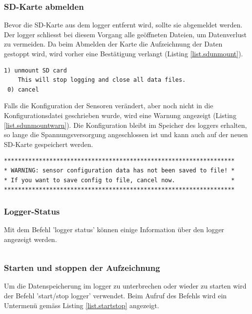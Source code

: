 \subsubsection{SD-Karte abmelden}\label{sssec.sdunmount}
Bevor die SD-Karte aus dem \gls{logger} entfernt wird, sollte sie abgemeldet werden. Der \gls{logger} schliesst bei diesem Vorgang alle geöffneten Dateien, um Datenverlust zu vermeiden. Da beim Abmelden der Karte die Aufzeichnung der Daten gestoppt wird, wird vorher eine Bestätigung verlangt (Listing \ref{list.sdunmount}).

\begin{lstlisting}[caption=Untermenü SD-Karte abmelden, label=list.sdunmount]
 1) unmount SD card
    This will stop logging and close all data files.
 0) cancel
\end{lstlisting}

Falls die Konfiguration der Sensoren verändert, aber noch nicht in die Konfigurationsdatei geschrieben wurde, wird eine Warnung angezeigt (Listing \ref{list.sdunmountwarn}). Die Konfiguration bleibt im Speicher des \gls{logger}s erhalten, so lange die Spannungsversorgung angeschlossen ist und kann auch auf der neuen SD-Karte gespeichert werden.

\begin{lstlisting}[caption=Warnung vor SD-Karte abmelden bei ungespeicherter Konfiguration, label=list.sdunmountwarn]
******************************************************************
* WARNING: sensor configuration data has not been saved to file! *
* If you want to save config to file, cancel now.                *
******************************************************************
\end{lstlisting}

\subsubsection{Logger-Status}\label{sssec.loggerstate}
Mit dem Befehl 'logger status' können einige Information über den \gls{logger} angezeigt werden.

\begin{lstlisting}[caption=Untermenü Logger-Status, label=list.loggerstatus]

\end{lstlisting}


\subsubsection{Starten und stoppen der Aufzeichnung}\label{sssec.startstop}
Um die Datenspeicherung im \gls{logger} zu unterbrechen oder wieder zu starten wird der Befehl 'start/stop logger' verwendet. Beim Aufruf des Befehls wird ein Untermenü gemäss Listing \ref{list.startstop} angezeigt.

